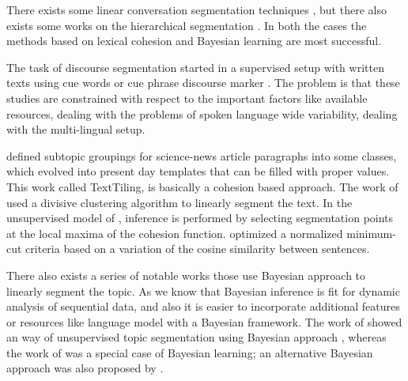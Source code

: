 \documentclass{article}
\begin{document}
There exists some linear conversation segmentation techniques \cite{hearst-97,kaufman1999,eisenstein-08}, but there also exists some works on the hierarchical segmentation \cite{eisenstein-09,simon2015}. In both the cases the methods based on lexical cohesion and Bayesian learning are most successful.%

The task of discourse segmentation started in a supervised setup with written texts using cue words or cue phrase discourse marker \cite{grosz-77,litman-93,elsner-08}. The problem is that these studies are constrained with respect to the important factors like available resources, dealing with the problems of spoken language wide variability, dealing with the multi-lingual setup.
%

\cite{hearst-97} defined subtopic groupings for science-news article paragraphs into some classes, which evolved into present day templates that can be filled with proper values. This work called TextTiling, is basically a cohesion based approach. The work of \cite{choi-00} used a divisive clustering algorithm to linearly segment the text. In the unsupervised model of \cite{galley-03}, inference is performed by selecting segmentation points at the local maxima of the cohesion function. \cite{malioutov-06} optimized a normalized minimum-cut criteria based on a variation of the cosine similarity between sentences.

There also exists a series of notable works those use Bayesian approach to linearly segment the topic. As we know that Bayesian inference is fit for dynamic analysis of sequential data, and also it is easier to incorporate additional features or resources like language model with a Bayesian framework. The work of \cite{eisenstein-08} showed an way of unsupervised topic segmentation using Bayesian approach , whereas the work of  \cite{utiyama-01} was a special case of Bayesian learning; an alternative Bayesian approach was also proposed by \cite{purver-06}.
\end{document}
